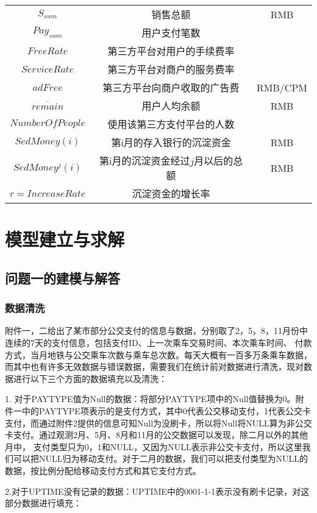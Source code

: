 \documentclass[withoutpreface,bwprint]{cumcmthesis} %
\begin{document}
\begin{center}
\begin{table}[htbp]
\begin{tabular}{c|c|c}
$S_{sum}$&销售总额&RMB\\
$Pay_{sum}$&用户支付笔数&\\
$FreeRate$&第三方平台对用户的手续费率&\\
$ServiceRate$&第三方平台对商户的服务费率&\\
$adFree$&第三方平台向商户收取的广告费&RMB/CPM\\
$\overline {remain}$&用户人均余额&RMB\\
${NumberOfPeople}$&使用该第三方支付平台的人数&\\
$SedMoney(i)$&第i月的存入银行的沉淀资金&RMB\\
$SedMoney^j(i)$&第i月的沉淀资金经过$j$月以后的总额&RMB\\
$r=IncreaseRate$&沉淀资金的增长率&\\\hline
\end{tabular}
\end{table}
\end{center}



\section{模型建立与求解}
\subsection{问题一的建模与解答}
\subsubsection{数据清洗}
附件一，二给出了某市部分公交支付的信息与数据，分别取了2，5，8，11月份中连续的7天的支付信息，包括支付ID、上一次乘车交易时间、本次乘车时间、
付款方式，当月地铁与公交乘车次数与乘车总次数。每天大概有一百多万条乘车数据，而其中也有许多无效数据与错误数据，需要我们在统计前对数据进行清洗，现对数据进行以下三个方面的数据填充以及清洗：

1. 对于PAYTYPE值为Null的数据：将部分PAYTYPE项中的Null值替换为0。附件一中的PAYTYPE项表示的是支付方式，其中0代表公交移动支付，1代表公交卡支付，而通过附件2提供的信息可知Null为没刷卡，所以将Null将NULL算为非公交卡支付。通过观测2月、5月、8月和11月的公交数据可以发现，除二月以外的其他月中，
支付类型只为0，1和NULL，又因为NULL表示非公交卡支付，所以这里我们可以把NULL归为移动支付。对于二月的数据，我们可以把支付类型为NULL的数据，按比例分配给移动支付方式和其它支付方式。

2.对于UPTIME没有记录的数据：UPTIME中的0001-1-1表示没有刷卡记录，对这部分数据进行填充：
\end{document}
